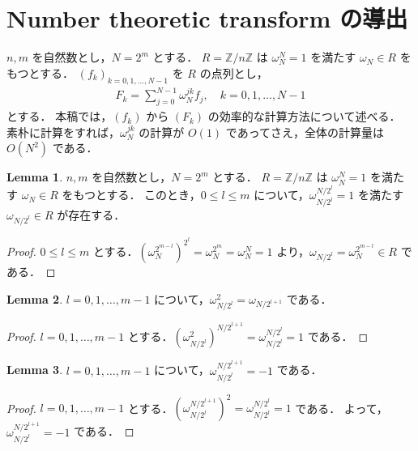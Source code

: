\documentclass[twocolumn, uplatex, dvipdfmx]{jsarticle}
\renewcommand{\le}{\leqslant}
\numberwithin{equation}{section}
\theoremstyle{definition}
\newtheorem{lem}{Lemma}[section]
\begin{document}
\section{Number theoretic transform の導出}

$n,m$ を自然数とし，$N=2^m$ とする．
$R=\mathbb{Z}/n\mathbb{Z}$ は $\omega_N^N=1$ を満たす $\omega_N\in R$ をもつとする．
$(f_k)_{k=0,1,\dots,N-1}$ を $R$ の点列とし，
\begin{align}
	F_k=\sum_{j=0}^{N-1}\omega_N^{jk}f_j,\quad k=0,1,\dots,N-1\label{eq:F_k}
\end{align}
とする．
本稿では，$(f_k)$ から $(F_k)$ の効率的な計算方法について述べる．
素朴に計算をすれば，$\omega_N^{jk}$ の計算が $O(1)$ であってさえ，全体の計算量は $O(N^2)$ である．

\begin{lem}\label{lem:omega_exists}
	$n,m$ を自然数とし，$N=2^m$ とする．
	$R=\mathbb{Z}/n\mathbb{Z}$ は $\omega_N^N=1$ を満たす $\omega_N\in R$ をもつとする．
	このとき，$0\le l\le m$ について，$\omega_{N/2^l}^{N/2^l}=1$ を満たす $\omega_{N/2^l}\in R$ が存在する．
\end{lem}
\begin{proof}
	$0\le l\le m$ とする．$(\omega_N^{2^{m-l}})^{2^l}=\omega_N^{2^m}=\omega_N^N=1$ より，$\omega_{N/2^l}=\omega_N^{2^{m-l}}\in R$ である．
\end{proof}

\begin{lem}\label{lem:omega_square}
	$l=0,1,\dots,m-1$ について，$\omega_{N/2^l}^2=\omega_{N/2^{l+1}}$ である．
\end{lem}
\begin{proof}
	$l=0,1,\dots,m-1$ とする．$(\omega_{N/2^l}^2)^{N/2^{l+1}}=\omega_{N/2^l}^{N/2^l}=1$ である．
\end{proof}

\begin{lem}\label{lem:omega_-1}
	$l=0,1,\dots,m-1$ について，$\omega_{N/2^l}^{N/2^{l+1}}=-1$ である．
\end{lem}
\begin{proof}
	$l=0,1,\dots,m-1$ とする．$(\omega_{N/2^l}^{N/2^{l+1}})^2=\omega_{N/2^l}^{N/2^l}=1$ である．
	よって，$\omega_{N/2^l}^{N/2^{l+1}}=-1$ である．
\end{proof}
\end{document}

